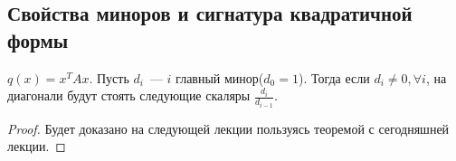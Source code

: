 \subsection{Свойства миноров и сигнатура квадратичной формы}
\begin{theorem}
    $q(x) = x^T Ax$. Пусть $d_i$~--- $i$ главный минор($d_0=1$). Тогда если $d_i \not= 0,\forall i$, на диагонали
    будут стоять следующие скаляры $\frac{d_i}{d_{i - 1}}$.
\end{theorem}
\begin{proof}
    Будет доказано на следующей лекции пользуясь теоремой с сегодняшней лекции.
\end{proof}
